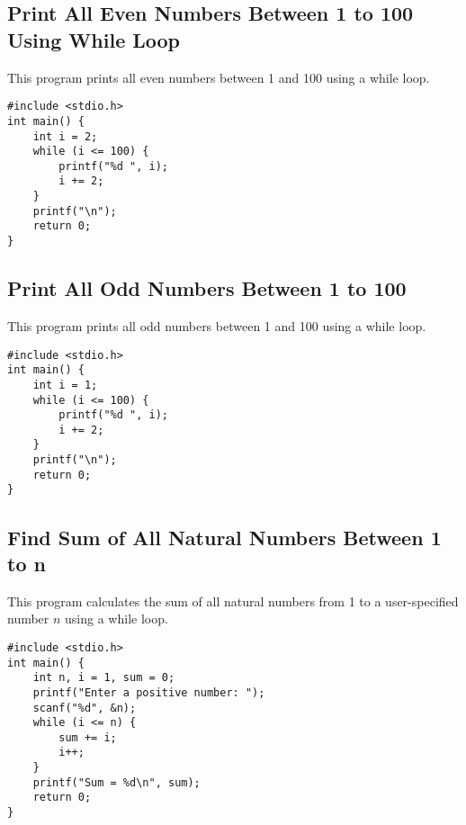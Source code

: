 \documentclass[a4paper,12pt]{article}
\begin{document}
\newpage

\subsection{Print All Even Numbers Between 1 to 100 Using While Loop}
This program prints all even numbers between 1 and 100 using a while loop.

\begin{lstlisting}[caption={Print All Even Numbers Between 1 to 100 Using While Loop}]
#include <stdio.h>
int main() {
    int i = 2;
    while (i <= 100) {
        printf("%d ", i);
        i += 2;
    }
    printf("\n");
    return 0;
}
\end{lstlisting}

\newpage

\subsection{Print All Odd Numbers Between 1 to 100}
This program prints all odd numbers between 1 and 100 using a while loop.

\begin{lstlisting}[caption={Print All Odd Numbers Between 1 to 100}]
#include <stdio.h>
int main() {
    int i = 1;
    while (i <= 100) {
        printf("%d ", i);
        i += 2;
    }
    printf("\n");
    return 0;
}
\end{lstlisting}

\newpage

\subsection{Find Sum of All Natural Numbers Between 1 to n}
This program calculates the sum of all natural numbers from 1 to a user-specified number \(n\) using a while loop.

\begin{lstlisting}[caption={Find Sum of All Natural Numbers Between 1 to n}]
#include <stdio.h>
int main() {
    int n, i = 1, sum = 0;
    printf("Enter a positive number: ");
    scanf("%d", &n);
    while (i <= n) {
        sum += i;
        i++;
    }
    printf("Sum = %d\n", sum);
    return 0;
}
\end{lstlisting}

\newpage

\end{document}
